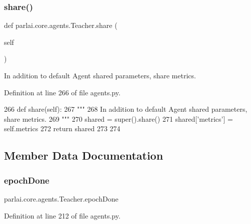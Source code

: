 \subsubsection{\texorpdfstring{share()}{share()}}
{\footnotesize\ttfamily def parlai.\+core.\+agents.\+Teacher.\+share (\begin{DoxyParamCaption}\item[{}]{self }\end{DoxyParamCaption})}

\begin{DoxyVerb}In addition to default Agent shared parameters, share metrics.
\end{DoxyVerb}
 

Definition at line 266 of file agents.\+py.


\begin{DoxyCode}
266     \textcolor{keyword}{def }share(self):
267         \textcolor{stringliteral}{"""}
268 \textcolor{stringliteral}{        In addition to default Agent shared parameters, share metrics.}
269 \textcolor{stringliteral}{        """}
270         shared = super().share()
271         shared[\textcolor{stringliteral}{'metrics'}] = self.metrics
272         \textcolor{keywordflow}{return} shared
273 
274 
\end{DoxyCode}


\subsection{Member Data Documentation}
\mbox{\label{classparlai_1_1core_1_1agents_1_1Teacher_a2a21915f2270b76ba0e99137d506af89}} 
\subsubsection{\texorpdfstring{epoch\+Done}{epochDone}}
{\footnotesize\ttfamily parlai.\+core.\+agents.\+Teacher.\+epoch\+Done}



Definition at line 212 of file agents.\+py.

\mbox{\label{classparlai_1_1core_1_1agents_1_1Teacher_a8385159acf54471fee8887ba2a83b53c}} 
